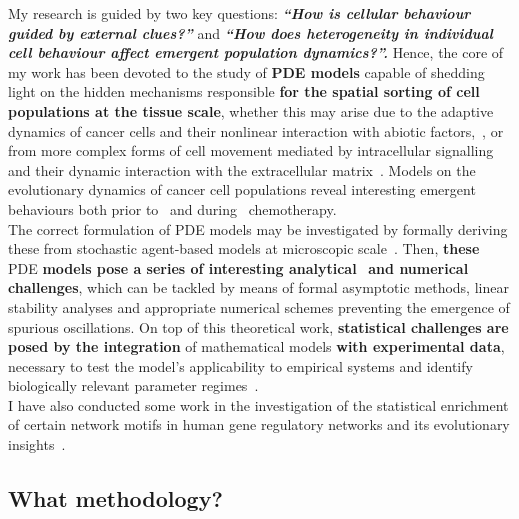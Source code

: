 \documentclass[10pt]{extarticle}
\def\tblue#1{\textcolor{ultramarine}{#1}}
\def\hlt#1{\textbf{#1}}
\begin{document}
My research is guided by two key questions: \textit{\textbf{“How is cellular behaviour guided by external clues?”}} and \textit{\textbf{“How does heterogeneity in individual cell behaviour affect emergent population dynamics?”.}} 
Hence, the core of my work has been devoted to the study of \hlt{PDE models} capable of shedding light on the hidden mechanisms responsible \hlt{for the spatial sorting of cell populations at the tissue scale}, whether this may arise due to the adaptive dynamics of cancer cells and their nonlinear interaction with abiotic factors,~\cite{lorenzi2024phenotype,padovano2024development,villa2021evolutionary,villa2021modeling},  or from more complex forms of cell movement mediated by intracellular signalling and their dynamic interaction with the extracellular matrix~\cite{lorenzi2024phenotype,perthame2024regularity,villa2021mechanical,villa2022novel}.  
Models on the evolutionary dynamics of cancer cell populations reveal interesting emergent behaviours both prior to~\cite{almeida2024evolutionary,villa2021evolutionary} and during~\cite{browning2024identifiability,padovano2024development,villa2021modeling} chemotherapy.\\
The correct formulation of PDE models may be investigated by formally deriving these from stochastic agent-based models at microscopic scale~\cite{lorenzi2024kinetic,lorenzi2020discrete,lorenzi2024phenotype}.  
Then, \hlt{these} PDE  \hlt{models pose a series of interesting analytical}~\cite{lorenzi2024phenotype,padovano2024development,perthame2024regularity,villa2021modeling,villa2024reducing}
 \hlt{and numerical}~\cite{lorenzi2024kinetic,lorenzi2024phenotype,villa2021mechanical}  \hlt{challenges}, which can be tackled by means of formal asymptotic methods, linear stability analyses and appropriate numerical schemes preventing the emergence of spurious oscillations.  
On top of this theoretical work, \hlt{statistical challenges are posed by the integration} of mathematical models \hlt{with experimental data}, necessary to test the model’s applicability to empirical systems and identify biologically relevant parameter regimes~\cite{almeida2024evolutionary,browning2024identifiability,hamis2024growth}.   \\
I have also conducted some work in the investigation of the statistical enrichment of certain network motifs in human gene regulatory networks and its evolutionary insights~\cite{mottes2021impact}.

\vspace{-0.5cm}
\tblue{\subsection*{{What methodology?}}}
\end{document}
